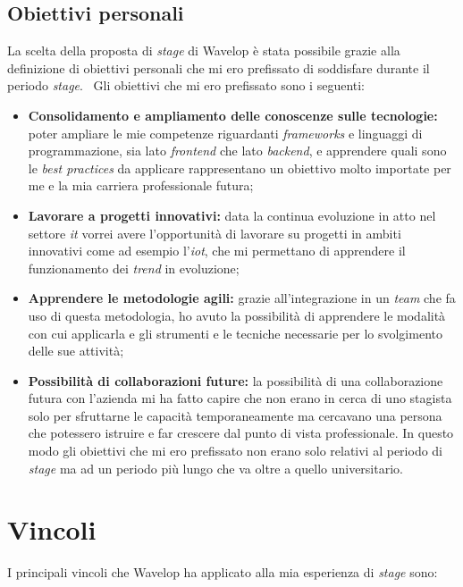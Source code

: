 \subsection{Obiettivi personali}
La scelta della proposta di \emph{stage} di Wavelop è stata possibile grazie alla definizione di obiettivi personali che mi ero prefissato di soddisfare durante il periodo \emph{stage}. \
Gli obiettivi che mi ero prefissato sono i seguenti:
\begin{itemize}
  \item \textbf{Consolidamento e ampliamento delle conoscenze sulle tecnologie:} poter ampliare le mie competenze riguardanti \emph{frameworks} e linguaggi di programmazione, sia lato \emph{\gls{frontend}} che lato \emph{\gls{backend}}, e apprendere quali sono le \emph{best practices} da applicare rappresentano un obiettivo molto importate per me e la mia carriera professionale futura;
  \item \textbf{Lavorare a progetti innovativi:} data la continua evoluzione in atto nel settore \emph{\acrshort{it}} vorrei avere l'opportunità di lavorare su progetti in ambiti innovativi come ad esempio l'\emph{\acrlong{iot}}, che mi permettano di apprendere il funzionamento dei \emph{trend} in evoluzione;
  \item \textbf{Apprendere le metodologie agili:} grazie all'integrazione in un \emph{team} che fa uso di questa metodologia, ho avuto la possibilità di apprendere le modalità con cui applicarla e gli strumenti e le tecniche necessarie per lo svolgimento delle sue attività;
  \item \textbf{Possibilità di collaborazioni future:} la possibilità di una collaborazione futura con l'azienda mi ha fatto capire che non erano in cerca di uno stagista solo per sfruttarne le capacità temporaneamente ma cercavano una persona che potessero istruire e far crescere dal punto di vista professionale. In questo modo gli obiettivi che mi ero prefissato non erano solo relativi al periodo di \emph{stage} ma ad un periodo più lungo che va oltre a quello universitario.
\end{itemize}

\section{Vincoli}

I principali vincoli che Wavelop ha applicato alla mia esperienza di \emph{stage} sono:
